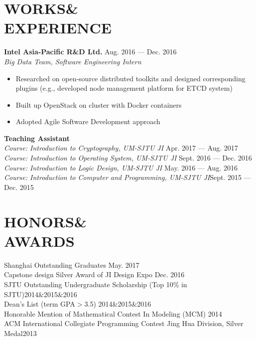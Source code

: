 \documentclass[margin,line,10pt]{res}
\begin{document}
\begin{resume}
\section{WORKS\&\\EXPERIENCE}
{\small
{\bf\normalsize Intel Asia-Pacific R\&D Ltd.} \hfill Aug. 2016 --- Dec. 2016 \\
{\it Big Data Team, Software Engineering Intern} 
}
\begin{itemize}
\setlength{\itemsep}{0pt}
\setlength{\parskip}{0pt}
\setlength{\parsep}{0pt}
\item {\small Researched on open-source distributed toolkits and designed corresponding plugins (e.g., developed node management platform for ETCD system)}
\item {\small Built up OpenStack on cluster with Docker containers}
\item {\small Adopted Agile Software Development approach}
\end{itemize}

{
\small
{\bf Teaching Assistant} \\
{\it Course: Introduction to Cryptography, UM-SJTU JI} \hfill Apr. 2017 --- Aug. 2017\\
{\it Course: Introduction to Operating System, UM-SJTU JI} \hfill Sept. 2016 --- Dec. 2016\\
{\it Course: Introduction to Logic Design, UM-SJTU JI} \hfill May. 2016 --- Aug. 2016 \\
{\it Course: Introduction to Computer and Programming, UM-SJTU JI}\hfill Sept. 2015 --- Dec. 2015
}

\section{HONORS\&\\AWARDS}
{
\small
Shanghai Outstanding Graduates \hfill May. 2017\\
Capstone design Silver Award of JI Design Expo \hfill Dec. 2016\\
SJTU Outstanding Undergraduate Scholarship {(Top 10\% in SJTU)}\hfill2014\&2015\&2016\\
Dean's List {(term GPA$>$3.5)} \hfill2014\&2015\&2016\\
Honorable Mention of Mathematical Contest In Modeling (MCM) \hfill2014\\
ACM International Collegiate Programming Contest Jing Hua Division, Silver Medal\hfill 2013\\
}


\end{resume}
\end{document}
